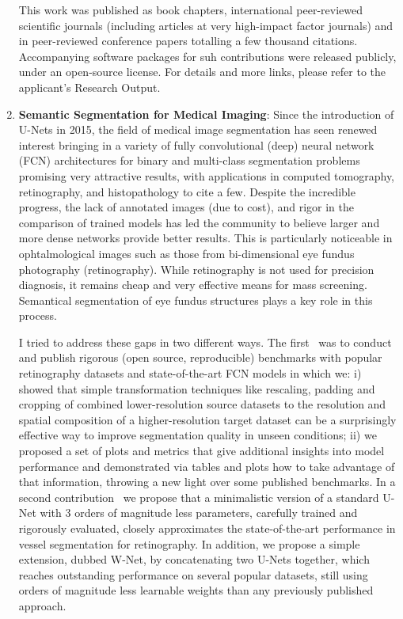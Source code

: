 \documentclass[a4paper]{nihbiosketch}
\begin{document}
\begin{enumerate}
\begin{itemize}
    \end{itemize}

    This work was published as book chapters, international peer-reviewed
    scientific journals (including articles at very high-impact factor
    journals) and in peer-reviewed conference papers totalling a few thousand
    citations. Accompanying software packages for suh contributions were
    released publicly, under an open-source license. For details and more
    links, please refer to the applicant's Research Output.

\item \textbf{Semantic Segmentation for Medical Imaging}: Since the
    introduction of U-Nets in 2015, the field of medical image segmentation has
    seen renewed interest bringing in a variety of fully convolutional (deep)
    neural network (FCN) architectures for binary and multi-class segmentation
    problems promising very attractive results, with applications in computed
    tomography, retinography, and histopathology to cite a few.  Despite the
    incredible progress, the lack of annotated images (due to cost), and rigor
    in the comparison of trained models has led the community to believe larger
    and more dense networks provide better results.  This is particularly
    noticeable in ophtalmological images such as those from bi-dimensional eye
    fundus photography (retinography).  While retinography is not used for
    precision diagnosis, it remains cheap and very effective means for mass
    screening.  Semantical segmentation of eye fundus structures plays a key
    role in this process.

    I tried to address these gaps in two different ways.  The
    first~\cite{arxiv-2019} was to conduct and publish rigorous (open source,
    reproducible) benchmarks with popular retinography datasets and
    state-of-the-art FCN models in which we: i) showed that simple
    transformation techniques like rescaling, padding and cropping of combined
    lower-resolution source datasets to the resolution and spatial composition
    of a higher-resolution target dataset can be a surprisingly effective way
    to improve segmentation quality in unseen conditions; ii) we proposed a set
    of plots and metrics that give additional insights into model performance
    and demonstrated via tables and plots how to take advantage of that
    information, throwing a new light over some published benchmarks. In a
    second contribution~\cite{arxiv-2020} we propose that a minimalistic
    version of a standard U-Net with 3 orders of magnitude less parameters,
    carefully trained and rigorously evaluated, closely approximates the
    state-of-the-art performance in vessel segmentation for retinography.  In
    addition, we propose a simple extension, dubbed W-Net, by concatenating two
    U-Nets together, which reaches outstanding performance on several popular
    datasets, still using orders of magnitude less learnable weights than any
    previously published approach.


\end{enumerate}
\end{document}
